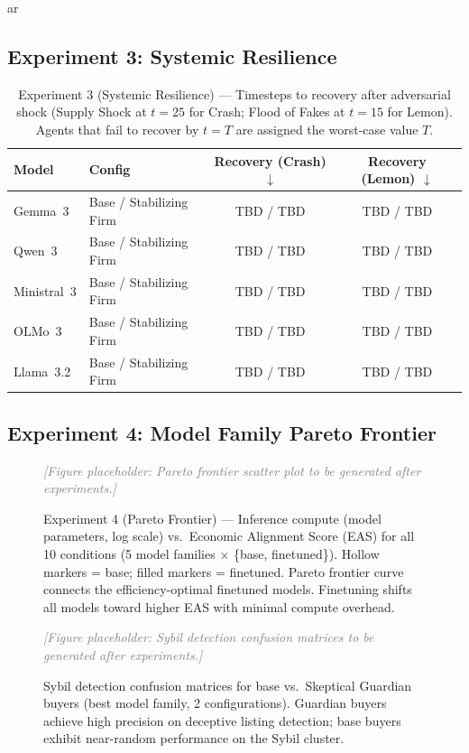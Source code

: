 ar\subsection{Experiment 3: Systemic Resilience}

\begin{table}[h]
\centering
\caption{Experiment 3 (Systemic Resilience) --- Timesteps to recovery after adversarial shock
(Supply Shock at $t=25$ for Crash; Flood of Fakes at $t=15$ for Lemon). Agents that fail to
recover by $t=T$ are assigned the worst-case value $T$.}
\label{tab:resilience}
\begin{tabular}{llcc}
\toprule
\textbf{Model} & \textbf{Config} & \textbf{Recovery (Crash)} $\downarrow$ & \textbf{Recovery (Lemon)} $\downarrow$ \\
\midrule
Gemma~3        & Base / Stabilizing Firm   & TBD / TBD & TBD / TBD \\
Qwen~3         & Base / Stabilizing Firm   & TBD / TBD & TBD / TBD \\
Ministral~3    & Base / Stabilizing Firm   & TBD / TBD & TBD / TBD \\
OLMo~3         & Base / Stabilizing Firm   & TBD / TBD & TBD / TBD \\
Llama~3.2      & Base / Stabilizing Firm   & TBD / TBD & TBD / TBD \\
\bottomrule
\end{tabular}
\end{table}

\subsection{Experiment 4: Model Family Pareto Frontier}

\begin{figure}[h]
\centering
\textcolor{gray}{\textit{[Figure placeholder: Pareto frontier scatter plot to be generated after experiments.]}}
\caption{Experiment 4 (Pareto Frontier) --- Inference compute (model parameters, log scale) vs.\
Economic Alignment Score (EAS) for all 10 conditions (5 model families $\times$ \{base, finetuned\}).
Hollow markers = base; filled markers = finetuned. Pareto frontier curve connects the efficiency-optimal
finetuned models. Finetuning shifts all models toward higher EAS with minimal compute overhead.}
\label{fig:pareto}
\end{figure}

\begin{figure}[h]
\centering
\textcolor{gray}{\textit{[Figure placeholder: Sybil detection confusion matrices to be generated after experiments.]}}
\caption{Sybil detection confusion matrices for base vs.\ Skeptical Guardian buyers (best model
family, 2 configurations). Guardian buyers achieve high precision on deceptive listing detection;
base buyers exhibit near-random performance on the Sybil cluster.}
\label{fig:sybil_confusion}
\end{figure}
